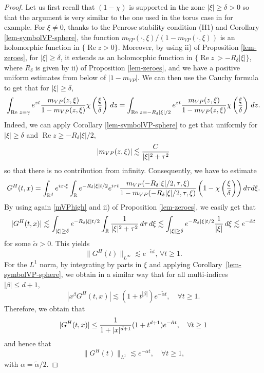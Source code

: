 \documentclass[11pt]{amsart}
\numberwithin{equation}{section}
\begin{document}
 \begin{proof}
 Let us first recall that  $(1 - \chi)$ is supported in the zone $|\xi| \geq \delta >0$ so that the argument is very similar
 to the one used in the torus case in \cite{GNR} for example.
  For $\xi \neq 0$, thanks to the Penrose stability condition (H1) and Corollary \ref{lem-symbolVP-sphere}, the function    $ m_{VP}(\cdot, \xi)/(1-m_{VP}(\cdot, \xi))$ is an holomorphic
   function in $\{\operatorname{Re} z >0\}$. Moreover, by using  ii) of Proposition \ref{lem-zeroes}, for $|\xi| \geq \delta$,  it extends as an holomorphic function
    in  $ \{\operatorname{Re} z \, >  - R_{\delta} | \xi|\} $,   where $R_{\delta}$ is given by ii) of Proposition \ref{lem-zeroes}, and we have a positive uniform estimates from below of  $|1-m_{VP}|$. We can then 
    use the Cauchy formula to get that
    for $|\xi| \geq \delta$, 
$$ \int_{\operatorname{Re}\, z= \gamma }   e^{z t } { m_{VP}(z,\xi) \over 1-m_{VP}(z, \xi)}
   \chi\left({\xi \over \delta} \right) \, dz  = \int_{\operatorname{Re}\, z= - R_{\delta} |\xi|/2}   e^{z t } { m_{VP}(z,\xi) \over 1-m_{VP}(z, \xi)}
   \chi\left({\xi \over \delta} \right) \, dz. 
   $$
    Indeed, we can apply  Corollary \eqref{lem-symbolVP-sphere} to get that uniformly  for  $|\xi| \geq \delta$ and $\operatorname{Re} z \geq -R_{\delta} |\xi|/2$, 
    \begin{equation}
    \label{mVPhigh}
     |m_{VP}(z, \xi) | \lesssim {  C \over |\xi|^2  + \tau^2}
    \end{equation}
    so that there is no contribution from infinity.
    Consequently, we have to estimate
    $$   G^H(t,x)=   \int_{\mathbb{R}^d } e^{i x \cdot \xi} \int_{\mathbb{R}}   e^{- R_{\delta} | \xi| t/2 }  e^{i \tau t}{ m_{VP}(- R_{\delta} | \xi| /2,\tau,\xi) \over 1-m_{VP}(- R_{\delta} | \xi| /2, \tau, \xi)}
   \left( 1- \chi\left({\xi \over \delta}\right)\right)  d\tau d\xi.$$
  By using again \eqref{mVPhigh} and ii) of Proposition \ref{lem-zeroes}, we easily get that
 $$  |G^H(t,x)| \lesssim  \int_{|\xi| \geq \delta }   e^{- R_{\delta} | \xi| t/2 }  \int_{ \mathbb{R}}  {  1 \over |\xi|^2  + \tau^2}
  \, d\tau\, d\xi  \lesssim    \int_{|\xi| \geq \delta }   e^{- R_{\delta} | \xi| t/2 }  { 1 \over | \xi |} \, d \xi
   \lesssim  e^{- \tilde \alpha t} $$
   for some $ \tilde \alpha >0$.
   This yields 
   $$ \| G^H(t) \|_{L^\infty} \lesssim e^{- \tilde \alpha t}, \, \forall t \geq 1.$$
   For the $L^1$ norm,  by integrating by parts in $\xi$ and applying Corollary~\ref{lem-symbolVP-sphere}, we obtain in a similar way that for all  multi-indices $|\beta|\leq d+1$,
   $$ | x^\beta G^H(t,x) | \lesssim (1+   t^{|\beta|}) e^{ - \tilde  \alpha t}, \quad \forall t \geq 1.$$
   Therefore, we obtain that
   $$ | G^H(t,x) | \leq { 1 \over 1 + |x|^{d+1}} (1 +   t^{d+1}) e^{ - \tilde  \alpha t}, \quad \forall t \geq 1$$
    and hence that
    $$ \|G^H(t)\|_{L^1} \lesssim e^{- \alpha t}, \quad \forall t \geq 1,$$
    with $\alpha = \tilde \alpha/2.$
     \end{proof}
  
\end{document}
